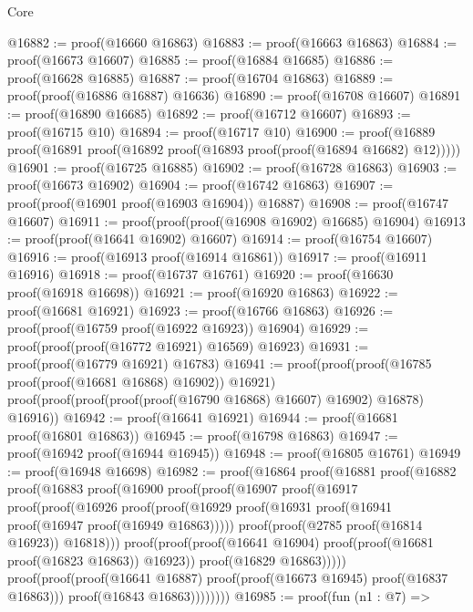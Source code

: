 \begin{lexlean}{Core}
\begin{coremodule}
@16882 := proof(@16660 @16863)
@16883 := proof(@16663 @16863)
@16884 := proof(@16673 @16607)
@16885 := proof(@16884 @16685)
@16886 := proof(@16628 @16885)
@16887 := proof(@16704 @16863)
@16889 := proof(proof(@16886 @16887) @16636)
@16890 := proof(@16708 @16607)
@16891 := proof(@16890 @16685)
@16892 := proof(@16712 @16607)
@16893 := proof(@16715 @10)
@16894 := proof(@16717 @10)
@16900 := proof(@16889 proof(@16891 proof(@16892 proof(@16893 proof(proof(@16894 @16682) @12)))))
@16901 := proof(@16725 @16885)
@16902 := proof(@16728 @16863)
@16903 := proof(@16673 @16902)
@16904 := proof(@16742 @16863)
@16907 := proof(proof(@16901 proof(@16903 @16904)) @16887)
@16908 := proof(@16747 @16607)
@16911 := proof(proof(proof(@16908 @16902) @16685) @16904)
@16913 := proof(proof(@16641 @16902) @16607)
@16914 := proof(@16754 @16607)
@16916 := proof(@16913 proof(@16914 @16861))
@16917 := proof(@16911 @16916)
@16918 := proof(@16737 @16761)
@16920 := proof(@16630 proof(@16918 @16698))
@16921 := proof(@16920 @16863)
@16922 := proof(@16681 @16921)
@16923 := proof(@16766 @16863)
@16926 := proof(proof(@16759 proof(@16922 @16923)) @16904)
@16929 := proof(proof(proof(@16772 @16921) @16569) @16923)
@16931 := proof(proof(@16779 @16921) @16783)
@16941 := proof(proof(proof(@16785 proof(proof(@16681 @16868) @16902)) @16921)
      proof(proof(proof(proof(proof(@16790 @16868) @16607) @16902) @16878) @16916))
@16942 := proof(@16641 @16921)
@16944 := proof(@16681 proof(@16801 @16863))
@16945 := proof(@16798 @16863)
@16947 := proof(@16942 proof(@16944 @16945))
@16948 := proof(@16805 @16761)
@16949 := proof(@16948 @16698)
@16982 := proof(@16864
      proof(@16881
          proof(@16882
              proof(@16883
                  proof(@16900
                      proof(proof(@16907
                            proof(@16917
                                proof(proof(@16926
                                      proof(proof(@16929
                                            proof(@16931
                                                proof(@16941 proof(@16947 proof(@16949 @16863)))))
                                          proof(proof(@2785 proof(@16814 @16923)) @16818)))
                                    proof(proof(proof(@16641 @16904)
                                          proof(proof(@16681 proof(@16823 @16863)) @16923))
                                        proof(@16829 @16863)))))
                          proof(proof(proof(@16641 @16887)
                                proof(proof(@16673 @16945) proof(@16837 @16863)))
                              proof(@16843 @16863))))))))
@16985 := proof(fun (n1 : @7) =>

\end{coremodule}
\end{lexlean}
